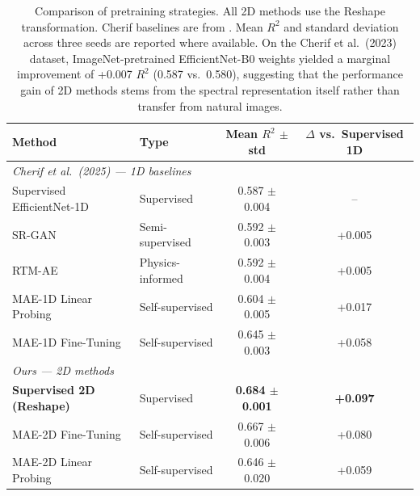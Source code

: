 \begin{table}[htbp]
\centering
\caption{Comparison of pretraining strategies. All 2D methods use the Reshape transformation. Cherif baselines are from \citet{cherif2025greenhyperspectra}. Mean $R^2$ and standard deviation across three seeds are reported where available. On the Cherif et al.\ (2023) dataset, ImageNet-pretrained EfficientNet-B0 weights yielded a marginal improvement of +0.007 $R^2$ (0.587 vs.\ 0.580), suggesting that the performance gain of 2D methods stems from the spectral representation itself rather than transfer from natural images.}
\label{tab:pretraining}
\begin{tabular}{llcc}
\toprule
Method & Type & Mean $R^2$ $\pm$ std & $\Delta$ vs.\ Supervised 1D \\
\midrule
\multicolumn{4}{l}{\textit{Cherif et al.\ (2025) --- 1D baselines}} \\
Supervised EfficientNet-1D   & Supervised       & 0.587 $\pm$ 0.004 & -- \\
SR-GAN                        & Semi-supervised  & 0.592 $\pm$ 0.003 & +0.005 \\
RTM-AE                        & Physics-informed & 0.592 $\pm$ 0.004 & +0.005 \\
MAE-1D Linear Probing         & Self-supervised  & 0.604 $\pm$ 0.005 & +0.017 \\
MAE-1D Fine-Tuning            & Self-supervised  & 0.645 $\pm$ 0.003 & +0.058 \\
\midrule
\multicolumn{4}{l}{\textit{Ours --- 2D methods}} \\
\textbf{Supervised 2D (Reshape)} & Supervised    & \textbf{0.684 $\pm$ 0.001} & \textbf{+0.097} \\
MAE-2D Fine-Tuning            & Self-supervised  & 0.667 $\pm$ 0.006 & +0.080 \\
MAE-2D Linear Probing         & Self-supervised  & 0.646 $\pm$ 0.020 & +0.059 \\
\bottomrule
\end{tabular}
\end{table}
